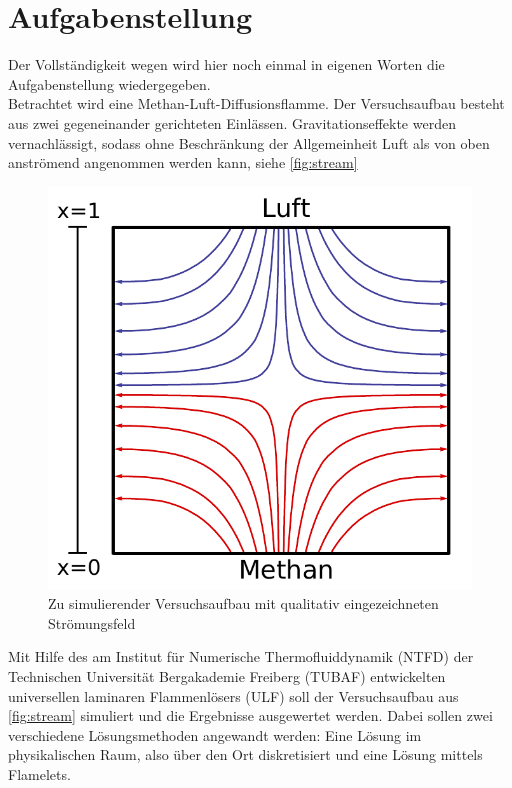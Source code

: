 
\section{Aufgabenstellung}
Der Vollständigkeit wegen wird hier noch einmal in eigenen Worten die Aufgabenstellung wiedergegeben.\\

Betrachtet wird eine Methan-Luft-Diffusionsflamme. Der Versuchsaufbau besteht aus zwei gegeneinander gerichteten Einlässen. Gravitationseffekte werden vernachlässigt, sodass ohne Beschränkung der Allgemeinheit Luft als von oben anströmend angenommen werden kann, siehe \autoref{fig:stream}
\begin{figure}[H]
    \begin{center}
        \includegraphics[width=0.4\linewidth]{stream}
    \end{center}
    \caption{Zu simulierender Versuchsaufbau mit qualitativ eingezeichneten Strömungsfeld}
    \label{fig:stream}
\end{figure}

Mit Hilfe des am Institut für Numerische Thermofluiddynamik (\gls{NTFD}) der Technischen Universität Bergakademie Freiberg (\gls{TUBAF}) entwickelten universellen laminaren Flammenlösers (\gls{ULF}) soll der Versuchsaufbau aus \autoref{fig:stream} simuliert und die Ergebnisse ausgewertet werden. Dabei sollen zwei verschiedene Lösungsmethoden angewandt werden: Eine Lösung im physikalischen Raum, also über den Ort diskretisiert und eine Lösung mittels Flamelets.

